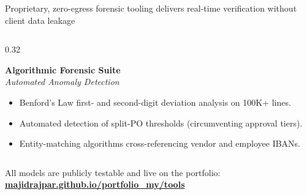\documentclass[aspectratio=169, 8pt]{beamer}
\begin{document}
\begin{frame}{Proprietary, zero-egress forensic tooling delivers real-time verification without client data leakage}
\begin{columns}[T]
        \begin{column}{0.32\textwidth}
            \begin{tcolorbox}[colback=cardBg, colframe=cardBorder, arc=1pt, boxrule=0.5pt, left=3pt, right=3pt, top=3pt, bottom=3pt]
                \textbf{\small \color{obsidian} Algorithmic Forensic Suite} \\
                \vspace{0.05cm}
                \textit{\tiny \color{terracotta} Automated Anomaly Detection}
            \end{tcolorbox}
            \begin{itemize}
                \setlength{\itemsep}{1.5pt}
                \item Benford's Law first- and second-digit deviation analysis on 100K+ lines.
                \item Automated detection of split-PO thresholds (circumventing approval tiers).
                \item Entity-matching algorithms cross-referencing vendor and employee IBANs.
            \end{itemize}
        \end{column}
    \end{columns}
    
    \vspace{0.2cm}
    \begin{tcolorbox}[colback=obsidian, colframe=obsidian, arc=1pt, boxrule=0pt, left=6pt, right=6pt, top=2pt, bottom=2pt]
        \centering
        \footnotesize \color{pureWhite} All models are publicly testable and live on the portfolio: \href{https://majidrajpar.github.io/portfolio_my/tools}{\textbf{\color{warmGold}majidrajpar.github.io/portfolio\_my/tools}}
    \end{tcolorbox}
\end{frame}
\end{document}
